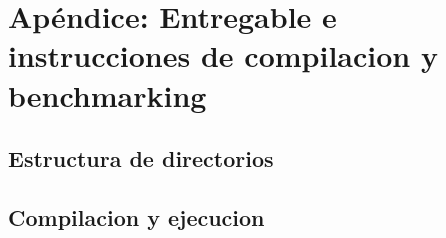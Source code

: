 \section{Ap\'endice: Entregable e instrucciones de compilacion y benchmarking}
\subsection{Estructura de directorios}

\subsection{Compilacion y ejecucion}

